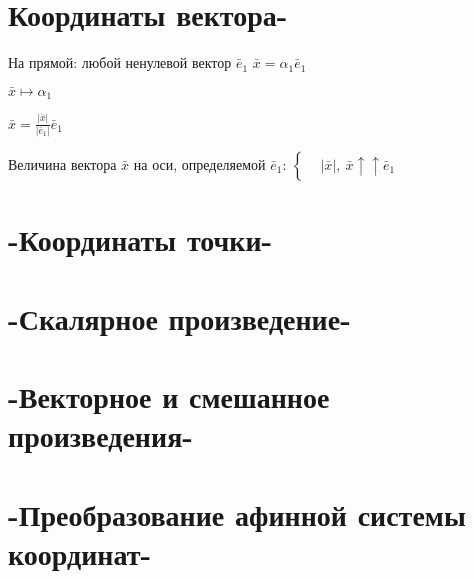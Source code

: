 \chapter{Координаты вектора-}
На  прямой: любой ненулевой вектор $\bar{e}_1$ \then $\bar{x}=\alpha_1\bar{e}_1$

$\bar{x}\mapsto\alpha_1$

$\bar{x}=\frac{|\bar{x}|}{|\bar{e}_1|}\bar{e}_1$

Величина вектора $\bar{x}$ на оси, определяемой $\bar{e}_1$: $\left\{\begin{aligned} & |\bar{x}|,\ \bar{x}\uparrow\uparrow\bar{e}_1 \end{aligned}\right.$
\chapter{-Координаты точки-}
\chapter{-Скалярное произведение-}
\chapter{-Векторное и смешанное произведения-}
\chapter{-Преобразование афинной системы координат-}

